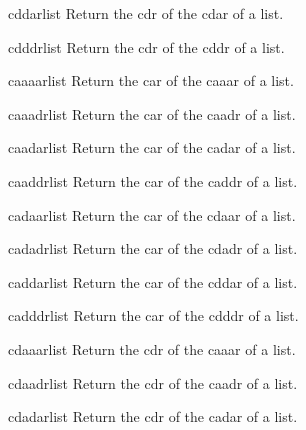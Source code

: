 \documentclass[10pt,english]{book}
\begin{document}
\begin{accessor}{cddar}{list}
  Return the cdr of the cdar of a list.
\end{accessor}

\begin{accessor}{cdddr}{list}
  Return the cdr of the cddr of a list.
\end{accessor}

\begin{accessor}{caaaar}{list}
  Return the car of the caaar of a list.
\end{accessor}

\begin{accessor}{caaadr}{list}
  Return the car of the caadr of a list.
\end{accessor}

\begin{accessor}{caadar}{list}
  Return the car of the cadar of a list.
\end{accessor}

\begin{accessor}{caaddr}{list}
  Return the car of the caddr of a list.
\end{accessor}

\begin{accessor}{cadaar}{list}
  Return the car of the cdaar of a list.
\end{accessor}

\begin{accessor}{cadadr}{list}
  Return the car of the cdadr of a list.
\end{accessor}

\begin{accessor}{caddar}{list}
  Return the car of the cddar of a list.
\end{accessor}

\begin{accessor}{cadddr}{list}
  Return the car of the cdddr of a list.
\end{accessor}

\begin{accessor}{cdaaar}{list}
  Return the cdr of the caaar of a list.
\end{accessor}

\begin{accessor}{cdaadr}{list}
  Return the cdr of the caadr of a list.
\end{accessor}

\begin{accessor}{cdadar}{list}
  Return the cdr of the cadar of a list.
\end{accessor}
\end{document}
